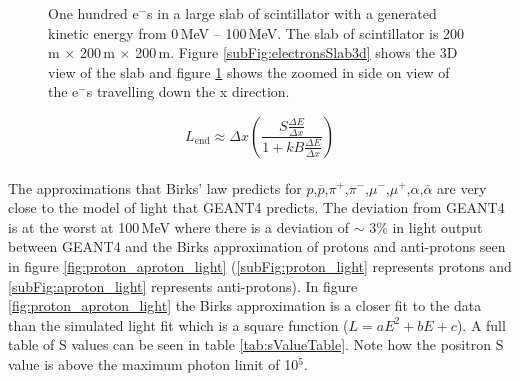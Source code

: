 \begin{figure}[!h]
\begin{subfigure}{.5\textwidth}
  \captionsetup{width=.9\linewidth}
  \caption{}
  \label{subFig:electronsSlabSideOn}
\end{subfigure}
\caption{One hundred e$^-$s in a large slab of scintillator with a generated kinetic energy from 0\,MeV -- 100\,MeV. The slab of scintillator is 200\,m $\times$ 200\,m $\times$ 200\,m. Figure \ref{subFig:electronsSlab3d} shows the 3D view of the slab and figure \ref{subFig:electronsSlabSideOn} shows the zoomed in side on view of the e$^-$s travelling down the x direction.}
\label{fig:electrons_viewed_in_slab}
\end{figure}

\begin{equation}
L_{\textrm{end}}\approx \Delta x \left(\frac{S\frac{\Delta E}{\Delta x}}{1 + kB \frac{\Delta E}{\Delta x}}\right) 
\label{equ:light_produced}
\end{equation}
\\The approximations that Birks' law predicts for $p$,$\overline{p}$,$\pi^+$,$\pi^-$,$\mu^-$,$\mu^+$,$\alpha$,$\overline{\alpha}$ are very close to the model of light that GEANT4 predicts. The deviation from GEANT4 is at the worst at 100\,MeV where there is a deviation of $\sim$ $3\%$ in light output between GEANT4 and the Birks approximation of protons and anti-protons seen in figure \ref{fig:proton_aproton_light} (\ref{subFig:proton_light} represents protons and \ref{subFig:aproton_light} represents anti-protons). In figure \ref{fig:proton_aproton_light} the Birks approximation is a closer fit to the data than the simulated light fit which is a square function ($L = aE^2 + bE+ c$). A full table of S values can be seen in table \ref{tab:sValueTable}. Note how the positron S value is above the maximum photon limit of 10$^5$. 

